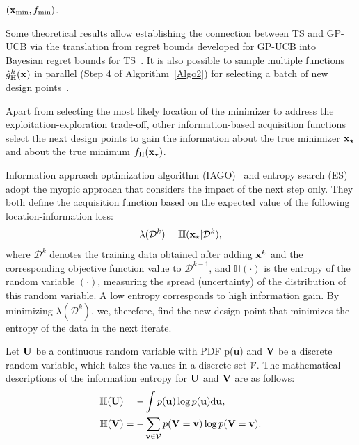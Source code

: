 \documentclass[iicol,sn-basic]{sn-jnl}%
\theoremstyle{thmstyleone}%
\theoremstyle{thmstyletwo}
\theoremstyle{thmstylethree}
\begin{document}
\begin{linenumbers}
\begin{algorithm}
\begin{algorithmic}[1]
		\State \Return $({\bf x}_{\min},f_{\min})$.
	\end{algorithmic}
\end{algorithm}

Some theoretical results allow establishing the connection between TS and GP-UCB via the translation from regret bounds developed for GP-UCB into Bayesian regret bounds for TS~\citep{Russo2014}.
It is also possible to sample multiple functions $\hat{g}_\text{H}^k({\bf x})$ in parallel (Step 4 of Algorithm~\ref{Algo2}) for selecting a batch of new design points~\citep{Kandasamy2018}.

Apart from selecting the most likely location of the minimizer to address the exploitation-exploration trade-off, other information-based acquisition functions select the next design points to gain the information about the true minimizer ${\bf x}_\star$ and about the true minimum $f_\text{H}({\bf x}_\star)$.

Information approach optimization algorithm (IAGO)~\citep{Villemonteix2009} and entropy search (ES)~\citep{Hennig2012} adopt the myopic approach that considers the impact of the next step only.
They both define the acquisition function based on the expected value of the following location-information loss:
\begin{equation}\label{Eq47}
	\lambda(\mathcal{D}^{k}) = \mathbb{H}({\bf x}_\star|\mathcal{D}^{k}),
\end{equation}
where $\mathcal{D}^{k}$ denotes the training data obtained after adding ${\bf x}^k$ and the corresponding objective function value to $\mathcal{D}^{k-1}$, and $\mathbb{H}(\cdot)$ is the entropy of the random variable $(\cdot)$, measuring the spread (uncertainty) of the distribution of this random variable.
A low entropy corresponds to high information gain. By minimizing $\lambda(\mathcal{D}^{k})$, we, therefore, find the new design point that minimizes the entropy of the data in the next iterate. 

Let ${\bf U}$ be a continuous random variable with PDF p({\bf u}) and ${\bf V}$ be a discrete random variable, which takes the values in a discrete set $\mathcal{V}$.
The mathematical descriptions of the information entropy for ${\bf U}$ and ${\bf V}$ are as follows:
\begin{subequations}\label{Eq48}
	\begin{align}
		\mathbb{H}({\bf U})& =-\int p({\bf u}) \log{p({\bf u})} \text{d}{\bf u}
		\label{Eq48-1},\\
		\mathbb{H}({\bf V}) & = -\sum_{{\bf v} \in \mathcal{V}}p({\bf V}={\bf v}) \log{p({\bf V}={\bf v})}
		\label{Eq48-2}.
	\end{align}
\end{subequations}


\end{linenumbers}
\end{document}
